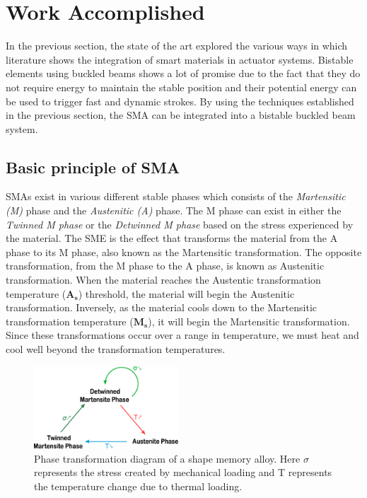 \section{Work Accomplished}\label{sec:work_accomplished}
In the previous section, the state of the art explored the various ways in which literature shows the integration of smart materials in actuator systems. Bistable elements using buckled beams shows a lot of promise due to the fact that they do not require energy to maintain the stable position and their potential energy can be used to trigger fast and dynamic strokes. By using the techniques established in the previous section, the SMA can be integrated into a bistable buckled beam system.

\subsection{Basic principle of SMA} \label{sec:WA_SMA}
SMAs exist in various different stable phases which consists of the \emph{Martensitic (M)} phase and the \emph{Austenitic (A)} phase. The M phase can exist in either the \emph{Twinned M phase} or the \emph{Detwinned M phase} based on the stress experienced by the material. The SME is the effect that transforms the material from the A phase to its M phase, also known as the Martensitic transformation. The opposite transformation, from the M phase to the A phase, is known as Austenitic transformation. When the material reaches the Austentic transformation temperature ($\mathbf{A_s}$) threshold, the material will begin the Austenitic transformation. Inversely, as the material cools down to the Martensitic transformation temperature ($\mathbf{M_s}$), it will begin the Martensitic transformation. Since these transformations occur over a range in temperature, we must heat and cool well beyond the transformation temperatures.

\begin{figure}
  \centering
  \includegraphics[width=0.48\textwidth]{Figures/Phase_Transf_Diagram_noText.eps}
  \caption{Phase transformation diagram of a shape memory alloy. Here $\sigma$ represents the stress created by mechanical loading and T represents the temperature change due to thermal loading.}
	\vspace{-10pt}
  \label{fig:PhaseTransfDiagram}
\end{figure}

